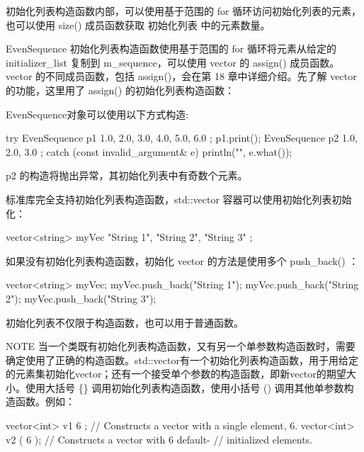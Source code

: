 初始化列表构造函数内部，可以使用基于范围的 for 循环访问初始化列表的元素，也可以使用 size() 成员函数获取 初始化列表 中的元素数量。

EvenSequence 初始化列表构造函数使用基于范围的 for 循环将元素从给定的 initializer\_list 复制到 m\_sequence，可以使用 vector 的 assign() 成员函数。vector 的不同成员函数，包括 assign()，会在第 18 章中详细介绍。先了解 vector 的功能，这里用了 assign() 的初始化列表构造函数：


EvenSequence对象可以使用以下方式构造:

\begin{cpp}
try {
    EvenSequence p1 { 1.0, 2.0, 3.0, 4.0, 5.0, 6.0 };
    p1.print();
    EvenSequence p2 { 1.0, 2.0, 3.0 };
} catch (const invalid_argument& e) {
    println("{}", e.what());
}
\end{cpp}

p2 的构造将抛出异常，其初始化列表中有奇数个元素。

标准库完全支持初始化列表构造函数，std::vector 容器可以使用初始化列表初始化：

\begin{cpp}
vector<string> myVec { "String 1", "String 2", "String 3" };
\end{cpp}

如果没有初始化列表构造函数，初始化 vector 的方法是使用多个 push\_back() ：

\begin{cpp}
vector<string> myVec;
myVec.push_back("String 1");
myVec.push_back("String 2");
myVec.push_back("String 3");
\end{cpp}

初始化列表不仅限于构造函数，也可以用于普通函数。

\begin{myNotic}{NOTE}
当一个类既有初始化列表构造函数，又有另一个单参数构造函数时，需要确定使用了正确的构造函数。std::vector有一个初始化列表构造函数，用于用给定的元素集初始化vector；还有一个接受单个参数的构造函数，即新vector的期望大小。使用大括号 \{\} 调用初始化列表构造函数，使用小括号 () 调用其他单参数构造函数。例如：

\begin{cpp}
vector<int> v1 { 6 }; // Constructs a vector with a single element, 6.
vector<int> v2 ( 6 ); // Constructs a vector with 6 default-
                      // initialized elements.
\end{cpp}
\end{myNotic}

